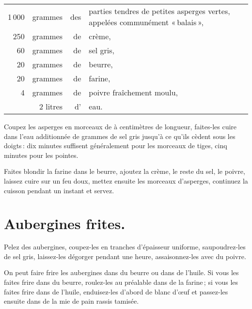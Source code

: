 \footnotesize
\begin{longtable}{rrrp{16em}}
  1 000 & grammes  & des & parties tendres de petites asperges vertes, appelées communément « balais »,   \\
    250 & grammes  & de  & crème,                                                                         \\
     60 & grammes  & de  & sel gris,                                                                      \\
     20 & grammes  & de  & beurre,                                                                        \\
     20 & grammes  & de  & farine,                                                                        \\
      4 & grammes  & de  & poivre fraîchement moulu,                                                      \\
        & 2 litres & d'  & eau.                                                                           \\
\end{longtable}
\normalsize

Coupez les asperges en morceaux de {\mmm} à {\mmm} centimètres de
longueur, faites-les cuire dans l’eau additionnée de {\mmm} grammes de
sel gris jusqu'à ce qu'ils cèdent sous les doigts : dix minutes suffisent
généralement pour les morceaux de tiges, cinq minutes pour les pointes.

Faites blondir la farine dans le beurre, ajoutez la crème, le reste du sel, le
poivre, laissez cuire sur un feu doux, mettez ensuite les morceaux d'asperges,
continuez la cuisson pendant un instant et servez.

\section*{\centering Aubergines frites.}
{}

Pelez des aubergines, coupez-les en tranches d'épaisseur uniforme,
saupoudrez-les de sel gris, laissez-les dégorger pendant une heure,
assaisonnez-les avec du poivre.

On peut faire frire les aubergines dans du beurre ou dans de l'huile. Si vous
les faites frire dans du beurre, roulez-les au préalable dans de la farine ; si
vous les faites frire dans de l'huile, enduisez-les d'abord de blanc d'œuf et
passez-les ensuite dans de la mie de pain rassis tamisée.

